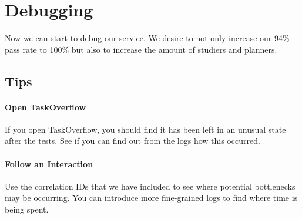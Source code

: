 \documentclass{csse4400}
\begin{document}
\section{Debugging}

Now we can start to debug our service.
We desire to not only increase our 94\% pass rate to 100\% but also to increase the amount of studiers and planners.

\subsection{Tips}

\paragraph{Open TaskOverflow}
If you open TaskOverflow,
you should find it has been left in an unusual state after the tests.
See if you can find out from the logs how this occurred.

\paragraph{Follow an Interaction}
Use the correlation IDs that we have included to see where potential bottlenecks may be occurring.
You can introduce more fine-grained logs to find where time is being spent.

\end{document}
